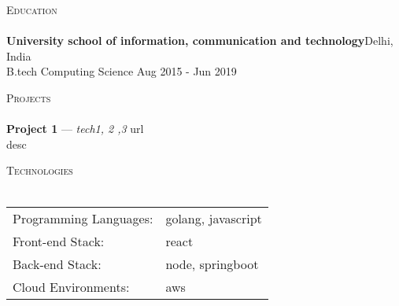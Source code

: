 \documentclass[a4paper]{article}
\newcommand{\lineunder} {
    \vspace*{-8pt} \\
    \hspace*{-18pt} \hrulefill \\
}
\newcommand{\header} [1] {
    {\hspace*{-18pt}\vspace*{6pt} \textsc{#1}}
    \vspace*{-6pt} \lineunder
}
\begin{document}
\header{Education}
\textbf{University school of information, communication and technology}\hfill Delhi, India\\
B.tech Computing Science \hfill Aug 2015 - Jun 2019\\
\vspace*{2mm}

\header{Projects}
{\textbf{Project 1}} — {\sl tech1, 2 ,3} \hfill url\\
desc
\vspace*{1mm}




\header{Technologies}
\begin{tabular}{ l l }
	Programming Languages: & golang, javascript \\
	Front-end Stack:       & react \\
	Back-end Stack:        & node, springboot     \\
	Cloud Environments:    & aws           \\
\end{tabular}
\vspace{2mm}

\
\end{document}
